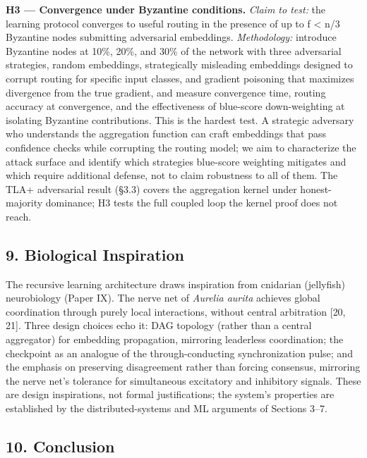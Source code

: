 \textbf{H3 --- Convergence under Byzantine conditions.} \emph{Claim to
test:} the learning protocol converges to useful routing in the presence
of up to f \textless{} n/3 Byzantine nodes submitting adversarial
embeddings. \emph{Methodology:} introduce Byzantine nodes at 10\%, 20\%,
and 30\% of the network with three adversarial strategies, random
embeddings, strategically misleading embeddings designed to corrupt
routing for specific input classes, and gradient poisoning that
maximizes divergence from the true gradient, and measure convergence
time, routing accuracy at convergence, and the effectiveness of
blue-score down-weighting at isolating Byzantine contributions. This is
the hardest test. A strategic adversary who understands the aggregation
function can craft embeddings that pass confidence checks while
corrupting the routing model; we aim to characterize the attack surface
and identify which strategies blue-score weighting mitigates and which
require additional defense, not to claim robustness to all of them. The
TLA+ adversarial result (§3.3) covers the aggregation kernel under
honest-majority dominance; H3 tests the full coupled loop the kernel
proof does not reach.

\subsection{9. Biological Inspiration}\label{biological-inspiration}

The recursive learning architecture draws inspiration from cnidarian
(jellyfish) neurobiology (Paper IX). The nerve net of \emph{Aurelia
aurita} achieves global coordination through purely local interactions,
without central arbitration {[}20, 21{]}. Three design choices echo it:
DAG topology (rather than a central aggregator) for embedding
propagation, mirroring leaderless coordination; the checkpoint as an
analogue of the through-conducting synchronization pulse; and the
emphasis on preserving disagreement rather than forcing consensus,
mirroring the nerve net's tolerance for simultaneous excitatory and
inhibitory signals. These are design inspirations, not formal
justifications; the system's properties are established by the
distributed-systems and ML arguments of Sections 3--7.

\subsection{10. Conclusion}\label{conclusion}

